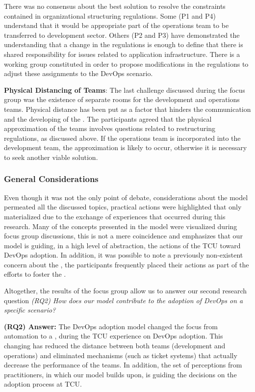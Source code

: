 There was no consensus about the best solution to resolve the constraints
contained in organizational structuring regulations. Some (P1 and P4) understand
that it would be appropriate part of the operations team to be transferred to
development sector. Others (P2 and P3) have demonstrated the understanding that
a change in the regulations is enough to define that there is shared
responsibility for issues related to application infrastructure. There is a
working group constituted in order to propose modifications in the regulations
to adjust these assignments to the DevOps scenario.

\textbf{Physical Distancing of Teams}:
The last challenge discussed during the focus group was the existence of
separate rooms for the development and operations teams. Physical distance has
been put as a factor that hinders the communication and the developing of
the \cc. The participants agreed that the physical approximation of the teams
involves questions related to restructuring regulations, as discussed above. If
the operations team is incorporated into the development team, the approximation
is likely to occur, otherwise it is necessary to seek another viable solution.

\subsubsection{General Considerations}

Even though it was not the only point of debate, considerations about the model
permeated all the discussed topics, practical actions were highlighted that only
materialized due to the exchange of experiences that occurred during this
research. Many of the concepts presented in the model were visualized during
focus group discussions, this is not a mere coincidence and emphasizes that our
model is guiding, in a high level of abstraction, the actions of the TCU toward
DevOps adoption. In addition, it was possible to note a previously non-existent
concern about the \cc, the participants frequently placed their actions as part
of the efforts to foster the \cc. {\color{blue}Altogether, the results of the
focus group allow us to answer our second research question 
\emph{(RQ2) How does our model contribute to the adoption of DevOps on a specific scenario?}

\begin{mr}
  {\bf (RQ2) Answer:} The DevOps adoption model
  changed the focus from automation to a \cc,
  during the TCU experience on DevOps adoption.
  This changing has reduced the distance
  between both teams (development and operations) and
  eliminated mechanisms (such as ticket systems)
  that actually decrease the performance of the teams.
  In addition, the set of perceptions from
  practitioners, in which our model builds upon,
  is guiding the decisions on the adoption process
  at TCU. 
\end{mr}
}


